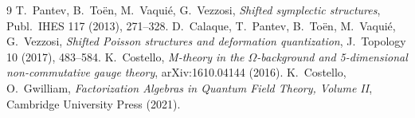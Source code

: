 \documentclass[11pt]{amsart}
\theoremstyle{plain}
\theoremstyle{definition}
\begin{document}
\begin{thebibliography}{9}
 T.~Pantev, B.~To\"en, M.~Vaqui\'e, G.~Vezzosi,
  \emph{Shifted symplectic structures}, Publ.~IHES 117 (2013), 271--328.
 D.~Calaque, T.~Pantev, B.~To\"en, M.~Vaqui\'e,
  G.~Vezzosi, \emph{Shifted Poisson structures and deformation
  quantization}, J.~Topology 10 (2017), 483--584.
 K.~Costello, \emph{M-theory in the $\Omega$-background
  and 5-dimensional non-commutative gauge theory}, arXiv:1610.04144 (2016).
 K.~Costello, O.~Gwilliam, \emph{Factorization Algebras in
  Quantum Field Theory, Volume II}, Cambridge University Press (2021).
\end{thebibliography}
\end{document}
